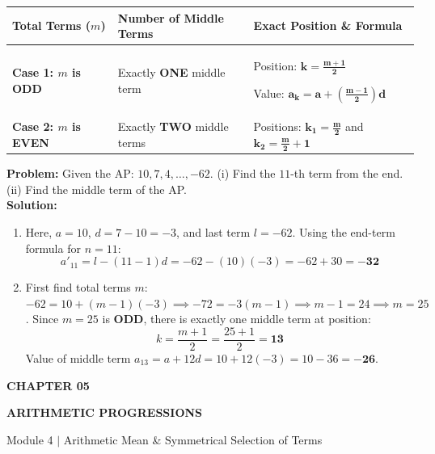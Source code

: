 \documentclass[10pt,a4paper]{article}
\newcommand{\chapterbanner}[4]{%
  \begin{tcolorbox}[enhanced,colback=bluepale,colframe=bluepale,boxrule=0pt,arc=2mm,
    left=3.5mm,right=3.5mm,top=1.6mm,bottom=1.6mm]
    {\footnotesize\bfseries\color{gold}CHAPTER #1\hfill\color{blue}#4}\par\vspace{0.3mm}
    {\Large\bfseries\color{navy}#2}\par
    {\small\color{muted}#3}
  \end{tcolorbox}\vspace{0.6mm}
}
\newcommand{\CoreTag}{\tcbox[colback=greenpale,colframe=green!40,boxrule=.3pt,arc=1mm,left=1.5mm,right=1.5mm,top=.4mm,bottom=.4mm]{\scriptsize\bfseries\color{green}CORE SYLLABUS}}
\begin{document}
\begin{tabularx}{\textwidth}{m{} | m{} | X}
\toprule
\rowcolor{bluepale}
\textbf{Total Terms ($m$)} & \textbf{Number of Middle Terms} & \textbf{Exact Position \& Formula} \\
\midrule
\textbf{Case 1: $m$ is ODD} & Exactly \textbf{ONE} middle term & Position: $\mathbf{k = \frac{m + 1}{2}}$ \par Value: $\mathbf{a_k = a + \left(\frac{m-1}{2}\right)d}$ \\
\midrule
\textbf{Case 2: $m$ is EVEN} & Exactly \textbf{TWO} middle terms & Positions: $\mathbf{k_1 = \frac{m}{2}}$ and $\mathbf{k_2 = \frac{m}{2} + 1}$ \\
\bottomrule
\end{tabularx}

\vspace{0.8mm}
\begin{conceptBox}[title={Worked Archetype 3 $\vert$ End-Term and Middle-Term Identification},fonttitle=\bfseries\color{navy}]
  \textbf{Problem:} Given the AP: $10, 7, 4, \dots, -62$. (i) Find the $11$-th term from the end. (ii) Find the middle term of the AP.\\
  \textbf{Solution:}
  \begin{enumerate}
    \item Here, $a = 10$, $d = 7 - 10 = -3$, and last term $l = -62$.
      Using the end-term formula for $n = 11$:
      $$a'_{11} = l - (11 - 1)d = -62 - (10)(-3) = -62 + 30 = \mathbf{-32}$$
    \item First find total terms $m$: $-62 = 10 + (m - 1)(-3) \implies -72 = -3(m - 1) \implies m - 1 = 24 \implies m = 25$.
      Since $m = 25$ is \textbf{ODD}, there is exactly one middle term at position:
      $$k = \frac{m + 1}{2} = \frac{25 + 1}{2} = \mathbf{13}$$
      Value of middle term $a_{13} = a + 12d = 10 + 12(-3) = 10 - 36 = \mathbf{-26}$.
  \end{enumerate}
\end{conceptBox}

\clearpage

\thispagestyle{fancy}
\vspace*{0mm}

\chapterbanner{05}{ARITHMETIC PROGRESSIONS}{Module 4 $\vert$ Arithmetic Mean \& Symmetrical Selection of Terms}{\CoreTag}
\end{document}
